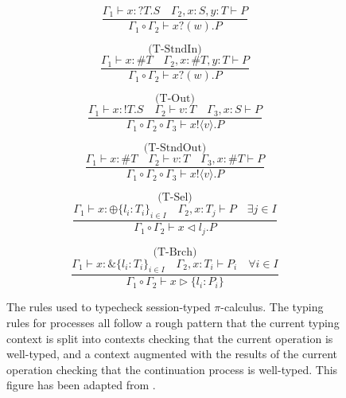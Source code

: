 \documentclass{l4proj}
\begin{document}
\begin{figure}[H]
\begin{subfigure}{0.48\textwidth}
\[\frac{\Gamma_{1} \vdash x : \texttt{?}T.S \quad \Gamma_{2}, x : S, y : T \vdash P}{\Gamma_{1} \circ \Gamma_{2} \vdash x\texttt{?}(w).P}\]
\vspace{\fill}
\end{subfigure}
\begin{subfigure}{0.48\textwidth}
\[\text{(T-StndIn)}\]
\[\frac{\Gamma_{1} \vdash x : \#T \quad \Gamma_{2}, x : \#T, y : T \vdash P}{\Gamma_{1} \circ \Gamma_{2} \vdash x\texttt{?}(w).P}\]
\vspace{\fill}
\end{subfigure}
\begin{subfigure}{0.48\textwidth}
\[\text{(T-Out)}\]
\[\frac{\Gamma_{1} \vdash x : \texttt{!}T.S \quad \Gamma_{2} \vdash v : T \quad \Gamma_{3}, x : S \vdash P}{\Gamma_{1} \circ \Gamma_{2} \circ \Gamma_{3} \vdash x\texttt{!} \langle v \rangle .P}\]
\vspace{\fill}
\end{subfigure}
\begin{subfigure}{0.48\textwidth}
\[\text{(T-StndOut)}\]
\[\frac{\Gamma_{1} \vdash x : \#T \quad \Gamma_{2} \vdash v : T \quad \Gamma_{3}, x : \#T \vdash P}{\Gamma_{1} \circ \Gamma_{2} \circ \Gamma_{3} \vdash x\texttt{!} \langle v \rangle .P}\]
\vspace{\fill}
\end{subfigure}
\begin{subfigure}{0.48\textwidth}
\[\text{(T-Sel)}\]
\[\frac{\Gamma_{1} \vdash x : \oplus\{l_{i}:T_{i}\}_{i \in I} \quad \Gamma_{2}, x : T_{j} \vdash P \quad \exists j \in I}{\Gamma_{1} \circ \Gamma_{2} \vdash x \triangleleft l_{j}.P}\]
\vspace{\fill}
\end{subfigure}
\begin{subfigure}{0.48\textwidth}
\[\text{(T-Brch)}\]
\[\frac{\Gamma_{1} \vdash x : \&\{l_{i}:T_{i}\}_{i \in I} \quad \Gamma_{2}, x : T_{i} \vdash P_{i} \quad \forall i \in I}{\Gamma_{1} \circ \Gamma_{2} \vdash x \triangleright \{l_{i}:P_{i}\}}\]
\vspace{\fill}
\end{subfigure}
\caption{The rules used to typecheck session-typed $\pi$-calculus. The typing rules for processes all follow a rough pattern that the current typing context is split into contexts checking that the current operation is well-typed, and a context augmented with the results of the current operation checking that the continuation process is well-typed. This figure has been adapted from \citet{DARDHA2017253}.}
\label{fig:sesProcType}
\end{figure}
\end{document}
